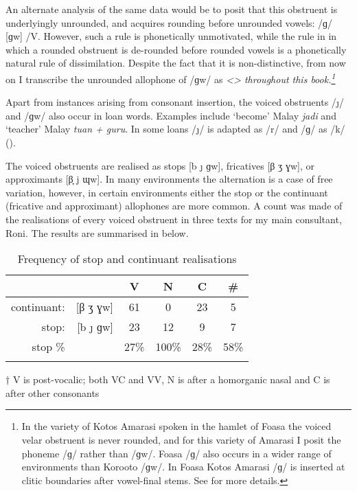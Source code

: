 An alternate analysis of the same data would be to posit that
this obstruent is underlyingly unrounded,
and acquires rounding before unrounded vowels:
/ɡ/ {\ra} [ɡw] /{\gap}V\tsc{[-round]}.
However, such a rule is phonetically unmotivated,
while the rule in  in which a rounded obstruent
is de-rounded before rounded vowels is a phonetically natural rule of dissimilation.
Despite the fact that it is non-distinctive,
from now on I transcribe the unrounded allophone
of /ɡw/ as \it{<}\it{>} throughout this book.\footnote{
		In the variety of Kotos Amarasi spoken in the hamlet of Fo{\Q}asa{\Q} the voiced velar obstruent is never rounded,
		and for this variety of Amarasi I posit the phoneme /ɡ/ rather than /ɡw/.
		Fo{\Q}asa{\Q} /ɡ/ also occurs in a wider range of environments than Koro{\Q}oto /ɡw/.
		In Fo{\Q}asa{\Q} Kotos Amarasi /ɡ/
		is inserted at clitic boundaries after vowel-final stems.
		See  for more details.}

Apart from instances arising from consonant insertion,
the voiced obstruents /\j/ and /ɡw/ also occur in loan words.
Examples include  `become' {\la} Malay \emph{jadi}
and  `teacher' {\la} Malay \emph{tuan + guru}.
In some loans /\j/ is adapted as /r/
and /ɡ/ as /k/ ().

The voiced obstruents are realised as stops [b {\j} ɡw],
fricatives [β ʒ ɣw], or approximants [β̞ j ɰw].
In many environments the alternation is a case of free variation,
however, in certain environments either the stop or the continuant
(fricative and approximant) allophones are more common.
A count was made of the realisations of every voiced
obstruent in three texts for my main consultant, Roni.
The results are summarised in  below.

\begin{table}[h]
	\centering\caption[Frequency of stop and continuant realisations]
	{Frequency of stop and continuant realisations}\label{tab:FreStoConRea}
		\begin{threeparttable}[b]
		\begin{tabular}{rrcccc} \lsptoprule
									&							&V{\gap}	& N{\gap} & C{\gap} & {\#}{\gap} \\ \midrule
			continuant:	&[β ʒ ɣw]			&61				&0				&23				&5 \\
			stop: 			&[b {\j} ɡw]	&23				&12				&9				&7 \\
			stop \%			&							&27\%			&100\%		&28\%			&58\% \\ \lspbottomrule
		\end{tabular}
		\begin{tablenotes}
		\item [†] V{\gap} is post-vocalic; both V{\gap}C and V{\gap}V,
							N{\gap} is after a homorganic nasal and C{\gap} is
							after other consonants
		\end{tablenotes}
	\end{threeparttable}
\end{table}

